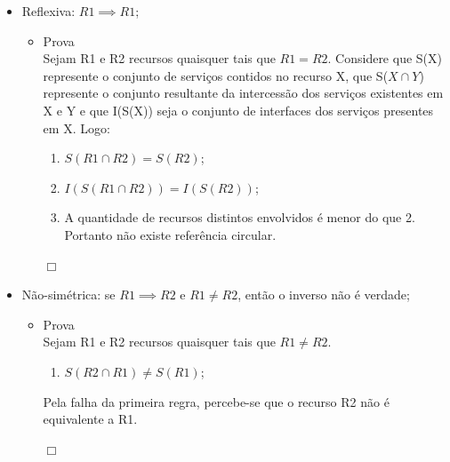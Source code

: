 \begin{itemize}
	\item Reflexiva: $R1 \implies R1$;

	\begin{itemize}
		\item Prova \\

		Sejam R1 e R2 recursos quaisquer tais que $R1 = R2$. Considere que S(X) represente o conjunto de serviços contidos no recurso X, que S($X \cap Y$) represente o conjunto resultante da intercessão dos serviços existentes em X e Y e que I(S(X)) seja o conjunto de interfaces dos serviços presentes em X. Logo: \\
		
		\begin{enumerate}
			
			\item $S(R1 \cap R2) = S(R2)$; \\
			\item $I(S(R1 \cap R2)) = I(S(R2))$; \\
			\item A quantidade de recursos distintos envolvidos é menor do que 2. Portanto não existe referência circular.
		\end{enumerate}
		\begin{flushright}$\Box$\end{flushright}
	\end{itemize}
	
	\item Não-simétrica: se $R1 \implies R2$ e $R1 \neq R2$, então o inverso não é verdade;

	\begin{itemize}
		\item Prova \\

		Sejam R1 e R2 recursos quaisquer tais que $R1 \neq R2$. \\

		\begin{enumerate}
			\item $S(R2 \cap R1) \neq S(R1)$; \\
		\end{enumerate}

		Pela falha da primeira regra, percebe-se que o recurso R2 não é equivalente a R1.
		\begin{flushright}$\Box$\end{flushright}
	\end{itemize}


\end{itemize}
